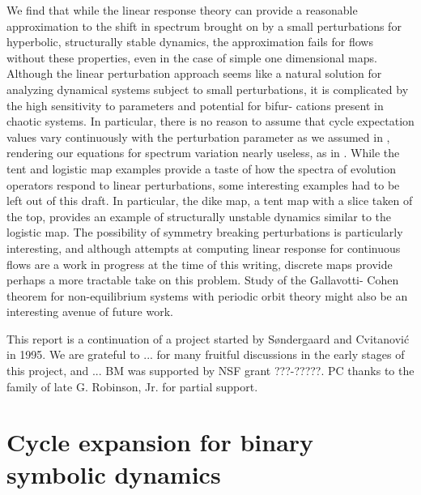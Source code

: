 \documentclass[aps,pre,
                showpacs,
                twocolumn,
                groupedaddress,
                superscriptaddress,
                floatfix]{revtex4-1}
\begin{document}
We find that while the linear response theory can provide a reasonable
approximation to the shift in spectrum brought on by a small
perturbations for hyperbolic, structurally stable dynamics, the
approximation fails for flows without these properties, even in the case
of simple one dimensional maps. Although the linear perturbation approach
seems like a natural solution for analyzing dynamical systems subject to
small perturbations, it is complicated by the high sensitivity to
parameters and potential for bifur- cations present in chaotic systems.
In particular, there is no reason to assume that cycle expectation values
vary continuously with the perturbation parameter as we assumed in
, rendering our equations for spectrum variation
nearly useless, as in .
While the tent and logistic map examples provide a taste of how the
spectra of evolution operators respond to linear perturbations, some
interesting examples had to be left out of this draft. In particular, the
dike map, a tent map with a slice taken of the top, provides
an example of structurally unstable dynamics similar to the logistic map.
The possibility of symmetry breaking perturbations is particularly
interesting, and although attempts at computing linear response for
continuous flows are a work in progress at the time of this writing,
discrete maps provide perhaps a more tractable take on this problem.
Study of the Gallavotti- Cohen theorem for non-equilibrium systems
with periodic orbit theory might also be an interesting avenue of future
work.


\begin{acknowledgments}
This report is a continuation of a project started by S{\o}ndergaard and
Cvitanovi\'c in 1995.
We are grateful to ... for many fruitful discussions in
the early stages of this project, and ...
BM was supported by NSF grant ???-?????.
PC thanks to the family of late G. Robinson, Jr. for partial support.
\end{acknowledgments}

\appendix

\section{Cycle expansion for binary symbolic dynamics}
\label{appe:cyclBinarySymbolic}
\end{document}

